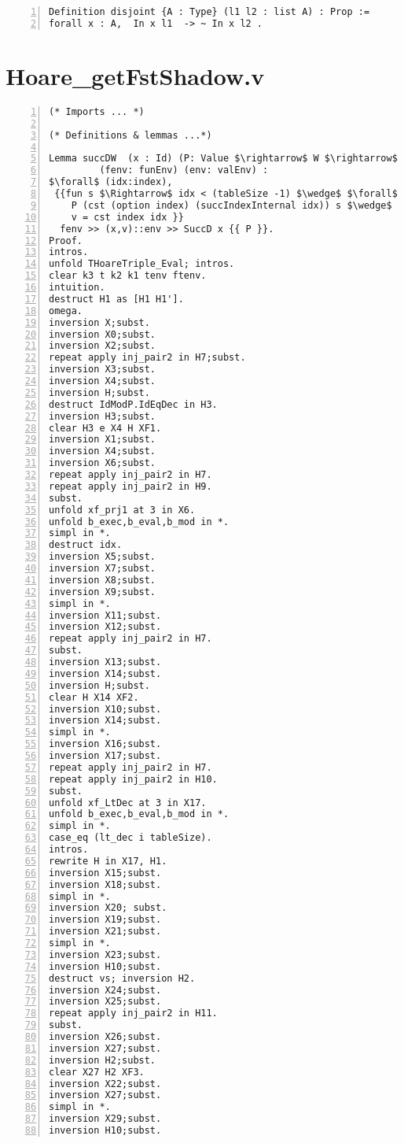 \begin{appendices}
\begin{lstlisting}[xleftmargin=-.1\textwidth,
xrightmargin=-.1\textwidth,
mathescape=true,numbers=left]
Definition disjoint {A : Type} (l1 l2 : list A) : Prop := 
forall x : A,  In x l1  -> ~ In x l2 . 
\end{lstlisting}

\chapter{Hoare\_getFstShadow.v} \label{getFstFile}
\begin{lstlisting}[xleftmargin=-.1\textwidth,
xrightmargin=-.1\textwidth,
mathescape=true,numbers=left]
(* Imports ... *)

(* Definitions & lemmas ...*)

Lemma succDW  (x : Id) (P: Value $\rightarrow$ W $\rightarrow$ Prop) (v:Value) 
	     (fenv: funEnv) (env: valEnv) :
$\forall$ (idx:index),
 {{fun s $\Rightarrow$ idx < (tableSize -1) $\wedge$ $\forall$  l : idx + 1 < tableSize, 
    P (cst (option index) (succIndexInternal idx)) s $\wedge$
    v = cst index idx }}  
  fenv >> (x,v)::env >> SuccD x {{ P }}.
Proof.
intros.
unfold THoareTriple_Eval; intros.
clear k3 t k2 k1 tenv ftenv.
intuition.
destruct H1 as [H1 H1'].
omega.
inversion X;subst.
inversion X0;subst.
inversion X2;subst.
repeat apply inj_pair2 in H7;subst.
inversion X3;subst.
inversion X4;subst.
inversion H;subst.
destruct IdModP.IdEqDec in H3.
inversion H3;subst.
clear H3 e X4 H XF1.
inversion X1;subst.
inversion X4;subst.
inversion X6;subst.
repeat apply inj_pair2 in H7.
repeat apply inj_pair2 in H9.
subst.
unfold xf_prj1 at 3 in X6.
unfold b_exec,b_eval,b_mod in *.
simpl in *.
destruct idx.
inversion X5;subst.
inversion X7;subst.
inversion X8;subst.
inversion X9;subst.
simpl in *.
inversion X11;subst.
inversion X12;subst.
repeat apply inj_pair2 in H7.
subst.
inversion X13;subst.
inversion X14;subst.
inversion H;subst.
clear H X14 XF2.
inversion X10;subst.
inversion X14;subst.
simpl in *.
inversion X16;subst.
inversion X17;subst.
repeat apply inj_pair2 in H7.
repeat apply inj_pair2 in H10.
subst.
unfold xf_LtDec at 3 in X17.
unfold b_exec,b_eval,b_mod in *.
simpl in *.
case_eq (lt_dec i tableSize).
intros.
rewrite H in X17, H1.
inversion X15;subst.
inversion X18;subst.
simpl in *.
inversion X20; subst.
inversion X19;subst.
inversion X21;subst.
simpl in *.
inversion X23;subst.
inversion H10;subst.
destruct vs; inversion H2.
inversion X24;subst.
inversion X25;subst.
repeat apply inj_pair2 in H11.
subst.
inversion X26;subst.
inversion X27;subst.
inversion H2;subst.
clear X27 H2 XF3.
inversion X22;subst.
inversion X27;subst.
simpl in *.
inversion X29;subst.
inversion H10;subst.

\end{lstlisting}
\end{appendices}
